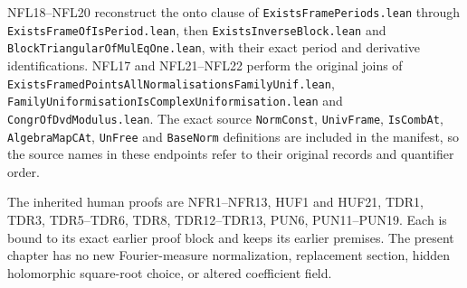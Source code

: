 NFL18--NFL20 reconstruct the onto clause of
\texttt{ExistsFramePeriods.lean} through
\texttt{ExistsFrameOfIsPeriod.lean}, then
\texttt{ExistsInverseBlock.lean} and
\texttt{BlockTriangularOfMulEqOne.lean}, with their exact period
and derivative identifications.
NFL17 and NFL21--NFL22 perform the original joins of
\texttt{Exists\allowbreak{}Framed\allowbreak{}Points\allowbreak{}All\allowbreak{}Normalisations\allowbreak{}Family\allowbreak{}Unif.lean},
\texttt{Family\allowbreak{}Uniformisation\allowbreak{}Is\allowbreak{}Complex\allowbreak{}Uniformisation.lean} and
\texttt{CongrOfDvdModulus.lean}.  The exact source
\texttt{NormConst}, \texttt{UnivFrame}, \texttt{IsCombAt},
\texttt{AlgebraMapCAt}, \texttt{UnFree} and \texttt{BaseNorm}
definitions are included in the manifest, so the source names
in these endpoints refer to their original records and
quantifier order.

The inherited human proofs are NFR1--NFR13, HUF1 and HUF21,
TDR1, TDR3, TDR5--TDR6, TDR8, TDR12--TDR13, PUN6,
PUN11--PUN19.  Each is bound to its exact earlier proof block
and keeps its earlier premises.  The present chapter has no
new Fourier-measure normalization, replacement section, hidden
holomorphic square-root choice, or altered coefficient field.
\par\endgroup
